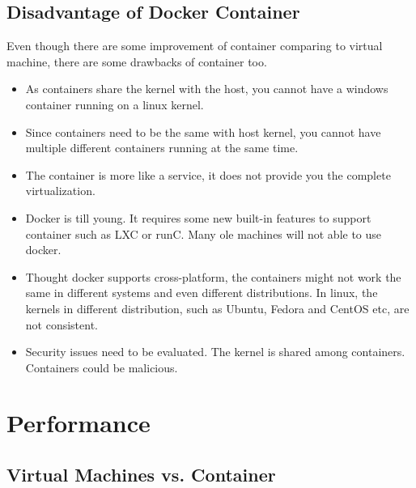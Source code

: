 \documentclass{sig-alternate}
\begin{document}
\subsection{Disadvantage of Docker Container}
Even though there are some improvement of container comparing to virtual machine, there are some drawbacks of container too. 
\begin{itemize}
\item As containers share the kernel with the host, you cannot have a windows container running on a linux kernel.
\item Since containers need to be the same with host kernel, you cannot have multiple different containers running at the same time. 
\item The container is more like a service, it does not provide you the complete virtualization.
\item Docker is till young. It requires some new built-in features to support container such as LXC or runC. Many ole machines will not able to use docker.
\item Thought docker supports cross-platform, the containers might not work the same in different systems and even different distributions. In linux, the kernels in different distribution, such as Ubuntu, Fedora and CentOS etc, are not consistent.
\item Security issues need to be evaluated. The kernel is shared among containers. Containers could be malicious. 
\end{itemize}

\section{Performance}
\subsection{Virtual Machines vs. Container}
\end{document}
